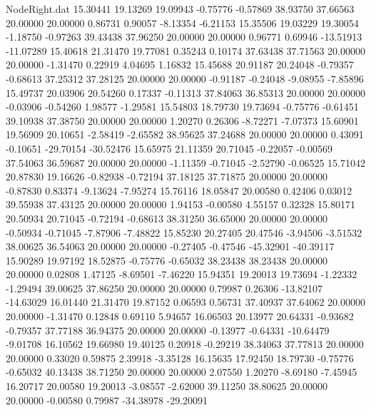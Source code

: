\begin{filecontents}{NodeRight.dat}
  15.30441   19.13269   19.09943    -0.75776   -0.57869   38.93750   37.66563   20.00000   20.00000    0.86731    0.90057   -8.13354   -6.21153
  15.35506   19.03229   19.30054    -1.18750   -0.97263   39.43438   37.96250   20.00000   20.00000    0.96771    0.69946  -13.51913  -11.07289
  15.40618   21.31470   19.77081     0.35243    0.10174   37.63438   37.71563   20.00000   20.00000   -1.31470    0.22919    4.04695    1.16832
  15.45688   20.91187   20.24048    -0.79357   -0.68613   37.25312   37.28125   20.00000   20.00000   -0.91187   -0.24048   -9.08955   -7.85896
  15.49737   20.03906   20.54260     0.17337   -0.11313   37.84063   36.85313   20.00000   20.00000   -0.03906   -0.54260    1.98577   -1.29581
  15.54803   18.79730   19.73694    -0.75776   -0.61451   39.10938   37.38750   20.00000   20.00000    1.20270    0.26306   -8.72271   -7.07373
  15.60901   19.56909   20.10651    -2.58419   -2.65582   38.95625   37.24688   20.00000   20.00000    0.43091   -0.10651  -29.70154  -30.52476
  15.65975   21.11359   20.71045    -0.22057   -0.00569   37.54063   36.59687   20.00000   20.00000   -1.11359   -0.71045   -2.52790   -0.06525
  15.71042   20.87830   19.16626    -0.82938   -0.72194   37.18125   37.71875   20.00000   20.00000   -0.87830    0.83374   -9.13624   -7.95274
  15.76116   18.05847   20.00580     0.42406    0.03012   39.55938   37.43125   20.00000   20.00000    1.94153   -0.00580    4.55157    0.32328
  15.80171   20.50934   20.71045    -0.72194   -0.68613   38.31250   36.65000   20.00000   20.00000   -0.50934   -0.71045   -7.87906   -7.48822
  15.85230   20.27405   20.47546    -3.94506   -3.51532   38.00625   36.54063   20.00000   20.00000   -0.27405   -0.47546  -45.32901  -40.39117
  15.90289   19.97192   18.52875    -0.75776   -0.65032   38.23438   38.23438   20.00000   20.00000    0.02808    1.47125   -8.69501   -7.46220
  15.94351   19.20013   19.73694    -1.22332   -1.29494   39.00625   37.86250   20.00000   20.00000    0.79987    0.26306  -13.82107  -14.63029
  16.01440   21.31470   19.87152     0.06593    0.56731   37.40937   37.64062   20.00000   20.00000   -1.31470    0.12848    0.69110    5.94657
  16.06503   20.13977   20.64331    -0.93682   -0.79357   37.77188   36.94375   20.00000   20.00000   -0.13977   -0.64331  -10.64479   -9.01708
  16.10562   19.66980   19.40125     0.20918   -0.29219   38.34063   37.77813   20.00000   20.00000    0.33020    0.59875    2.39918   -3.35128
  16.15635   17.92450   18.79730    -0.75776   -0.65032   40.13438   38.71250   20.00000   20.00000    2.07550    1.20270   -8.69180   -7.45945
  16.20717   20.00580   19.20013    -3.08557   -2.62000   39.11250   38.80625   20.00000   20.00000   -0.00580    0.79987  -34.38978  -29.20091

\end{filecontents}

